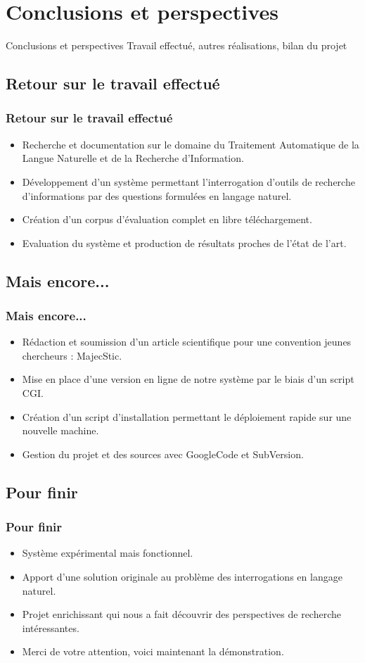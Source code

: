 \documentclass[xcolor=dvipsnames]{beamer}
\begin{document}
\section{Conclusions et perspectives}
\begin{frame}
\begin{block}{\Large{Conclusions et perspectives}}
\tiny{Travail effectué, autres réalisations, bilan du projet}
\end{block}
\end{frame}
\subsection{Retour sur le travail effectué}
\frame
{
  \frametitle{Retour sur le travail effectué}
  \begin{itemize}
    \item<1-> Recherche et documentation sur le domaine du Traitement Automatique de la Langue Naturelle et de la Recherche d'Information.
    \item<2-> Développement d'un système permettant l'interrogation d'outils de recherche d'informations par des questions formulées en langage naturel.
    \item<3-> Création d'un corpus d'évaluation complet en libre téléchargement.
    \item<4-> Evaluation du système et production de résultats proches de l'état de l'art.
  \end{itemize}
}
\subsection{Mais encore...}
\frame
{
  \frametitle{Mais encore...}
  \begin{itemize}
    \item<1-> Rédaction et soumission d'un article scientifique pour une convention jeunes chercheurs : MajecStic.
    \item<2-> Mise en place d'une version en ligne de notre système par le biais d'un script CGI.
    \item<3-> Création d'un script d'installation permettant le déploiement rapide sur une nouvelle machine.
    \item<4-> Gestion du projet et des sources avec GoogleCode et SubVersion.
  \end{itemize}
}
\subsection{Pour finir}
\frame
{
  \frametitle{Pour finir} 
  \begin{itemize}
      \item<1-> Système expérimental mais fonctionnel.
      \item<2-> Apport d'une solution originale au problème des interrogations en langage naturel.
      \item<3-> Projet enrichissant qui nous a fait découvrir des perspectives de recherche intéressantes.
      \item<4-> Merci de votre attention, voici maintenant la démonstration.
  \end{itemize}
}
\end{document}
